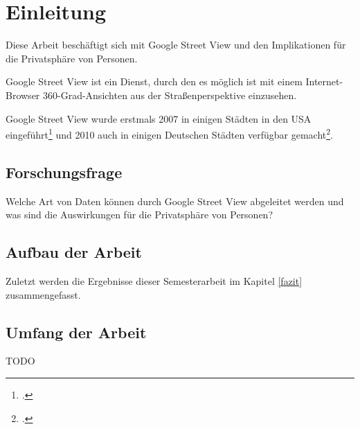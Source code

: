 \newpage
\section{Einleitung} \label{Einleitung}
Diese Arbeit beschäftigt sich mit Google Street View und den Implikationen für
die Privatsphäre von Personen.

Google Street View ist ein Dienst, durch den es möglich ist mit einem Internet-Browser
360-Grad-Ansichten aus der Straßenperspektive einzusehen. 

Google Street View wurde erstmals 2007 in einigen Städten in den USA
eingeführt\footcite{website:heise:google-street-view-einfuehrung-usa} und 2010 auch
in einigen Deutschen Städten verfügbar gemacht\footcite{website:sueddeutsche:20-deutsche-stadte-online}.



\subsection{Forschungsfrage}
Welche Art von Daten können durch Google Street View abgeleitet werden und was
sind die Auswirkungen für die Privatsphäre von Personen?

\subsection{Aufbau der Arbeit}

Zuletzt werden die Ergebnisse dieser Semesterarbeit im Kapitel \ref{fazit} zusammengefasst.

\subsection{Umfang der Arbeit}

TODO
